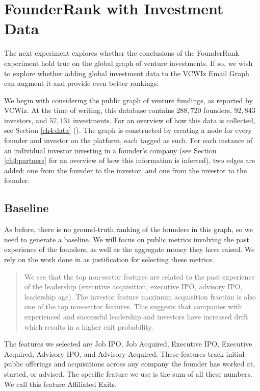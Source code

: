 \section{FounderRank with Investment Data}

The next experiment explores whether the conclusions of the FounderRank experiment hold true on the global graph of venture investments. If so, we wish to explore whether adding global investment data to the VCWIz Email Graph can augment it and provide even better rankings.

We begin with considering the public graph of venture fundings, as reported by VCWiz. At the time of writing, this database contains $288,720$ founders, $92,843$ investors, and $57,131$ investments. For an overview of how this data is collected, see Section \ref{ch4:data} (\pageref{ch4:data}). The graph is constructed by creating a node for every founder and investor on the platform, each tagged as such. For each instance of an individual investor investing in a founder's company (see Section \ref{ch4:partners} for an overview of how this information is inferred), two edges are added: one from the founder to the investor, and one from the investor to the founder.

\subsection{Baseline}

As before, there is no ground-truth ranking of the founders in this graph, so we need to generate a baseline. We will focus on public metrics involving the past experience of the founders, as well as the aggregate money they have raised. We rely on the work done in \cite{2017arXiv170604229H} as justification for selecting these metrics.

\begin{quote}
We see that the top non-sector features are related to the past experience of the leadership (executive acquisition, executive IPO, advisory IPO, leadership age). The investor feature maximum acquisition fraction is also one of the top non-sector features. This suggests that companies with experienced and successful leadership and investors have increased drift which results in a higher exit probability.
\end{quote}

The features we selected are Job IPO, Job Acquired, Executive IPO, Executive Acquired, Advisory IPO, and Advisory Acquired. These features track initial public offerings and acquisitions across any company the founder has worked at, started, or advised. The specific feature we use is the sum of all these numbers. We call this feature Affiliated Exits.

